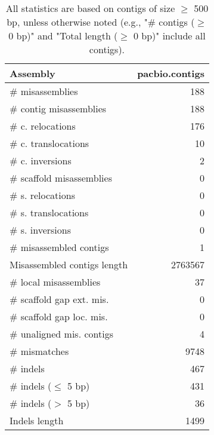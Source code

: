 \documentclass[12pt,a4paper]{article}
\begin{document}
\begin{table}[ht]
\begin{center}
\caption{All statistics are based on contigs of size $\geq$ 500 bp, unless otherwise noted (e.g., "\# contigs ($\geq$ 0 bp)" and "Total length ($\geq$ 0 bp)" include all contigs).}
\begin{tabular}{|l*{1}{|r}|}
\hline
Assembly & pacbio.contigs \\ \hline
\# misassemblies & 188 \\ \hline
\hspace{2mm}\# contig misassemblies & 188 \\ \hline
\hspace{5mm}\# c. relocations & 176 \\ \hline
\hspace{5mm}\# c. translocations & 10 \\ \hline
\hspace{5mm}\# c. inversions & 2 \\ \hline
\hspace{2mm}\# scaffold misassemblies & 0 \\ \hline
\hspace{5mm}\# s. relocations & 0 \\ \hline
\hspace{5mm}\# s. translocations & 0 \\ \hline
\hspace{5mm}\# s. inversions & 0 \\ \hline
\# misassembled contigs & 1 \\ \hline
Misassembled contigs length & 2763567 \\ \hline
\# local misassemblies & 37 \\ \hline
\# scaffold gap ext. mis. & 0 \\ \hline
\# scaffold gap loc. mis. & 0 \\ \hline
\# unaligned mis. contigs & 4 \\ \hline
\# mismatches & 9748 \\ \hline
\# indels & 467 \\ \hline
\hspace{5mm}\# indels ($\leq$ 5 bp) & 431 \\ \hline
\hspace{5mm}\# indels ($>$ 5 bp) & 36 \\ \hline
Indels length & 1499 \\ \hline
\end{tabular}
\end{center}
\end{table}
\end{document}
